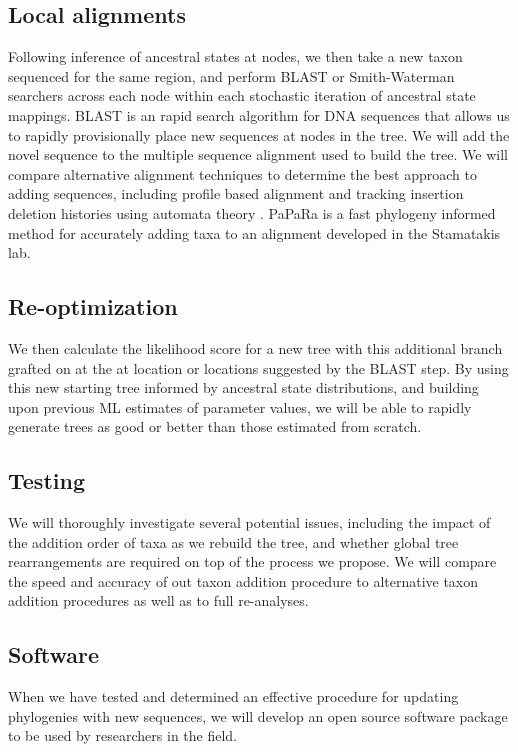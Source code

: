 \documentclass[10pt]{article}
\begin{document}
\subsection*{Local alignments}
Following inference of ancestral states at nodes, we then take a new taxon sequenced for the same region, and perform BLAST\cite{altschul_gapped_1997} or Smith-Waterman\cite{rognes_faster_2011} searchers across each node within each stochastic iteration of ancestral state mappings. 
BLAST is an rapid search algorithm for DNA sequences that allows us to rapidly provisionally place new sequences at nodes in the tree. 
We will add the novel sequence to the multiple sequence alignment used to build the tree. 
We will compare alternative alignment techniques to determine the best approach to adding sequences, including profile based alignment \cite{loytynoja_accurate_2012} \cite{smith_mega-phylogeny_2009} and tracking insertion deletion histories using automata theory \cite{westesson_accurate_2012}.
PaPaRa \cite{Berger_aligning_2011} is a fast phylogeny informed method for accurately adding taxa to an alignment developed in the Stamatakis lab.


\subsection*{Re-optimization}
We then calculate the likelihood score for a new tree with this additional branch grafted on at the at location or locations suggested by the BLAST step. 
By using this new starting tree informed by ancestral state distributions, and building upon previous ML estimates of parameter values, we will be able to rapidly generate trees as good or better than those estimated from scratch. 

\subsection*{Testing}
We will thoroughly investigate several potential issues, including the impact of the addition order of taxa as we rebuild the tree, and whether global tree rearrangements are required on top of the process we propose.
We will compare the speed and accuracy of out taxon addition procedure to alternative taxon addition procedures as well as to full re-analyses.


\subsection*{Software}
When we have tested and determined an effective procedure for updating phylogenies with new sequences, we will develop an open source software package to be used by researchers in the field.
\end{document}
